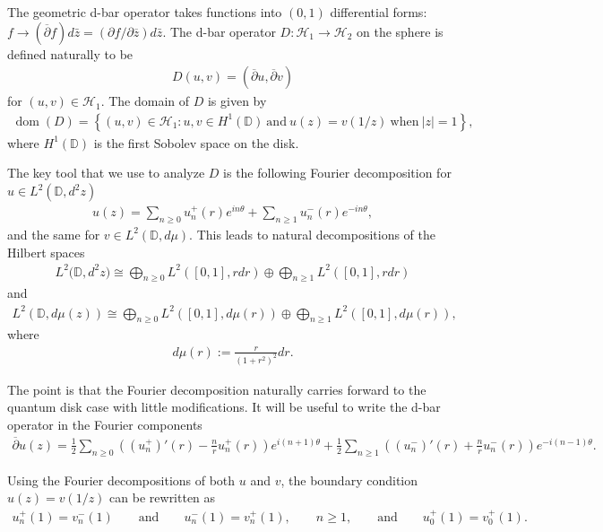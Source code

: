 \documentclass[11pt]{article}
\numberwithin{equation}{section}
\DeclareMathOperator{\dom}{dom}
\begin{document}
The geometric d-bar operator takes functions into $(0,1)$ dif\/ferential forms: $f\to (\overline{\partial}f)d\bar z=
(\partial f/\partial\overline{z})d\bar z$.
The d-bar operator $D: \mathcal{H}_1\to\mathcal{H}_2$ on the sphere is def\/ined naturally to be
\begin{gather}
\label{dirac_op}
D(u,v) = (\overline{\partial}u, \overline{\partial}v)
\end{gather}
for $(u,v)\in\mathcal{H}_1$.
The domain of $D$ is given by
\begin{gather}
\label{dom_D}
\dom(D) = \left\{(u,v)\in\mathcal{H}_1: u,v\in H^1({\mathbb D})~\text{and}~u(z)=v(1/z)~\textrm{when}~|z|=1\right\},
\end{gather}
where $H^1({\mathbb D})$ is the f\/irst Sobolev space on the disk.

The key tool that we use to analyze $D$ is the following Fourier decomposition for $u\in L^2({\mathbb D},d^2z)$
\begin{gather*}
u(z) = \sum\limits_{n\ge0} u_n^+(r) e^{in\theta} + \sum\limits_{n\ge1}u_n^-(r)e^{-in\theta},
\end{gather*}
and the same for $v\in L^2({\mathbb D},d\mu)$.
This leads to natural decompositions of the Hilbert spaces
\begin{gather*}
L^2\big({\mathbb D}, d^2z\big) \cong \bigoplus_{n\ge0} L^2\left([0,1],rdr\right)\oplus \bigoplus_{n\ge
1}L^2\left([0,1],rdr\right)
\end{gather*}
and
\begin{gather*}
L^2({\mathbb D},d\mu(z)) \cong \bigoplus_{n\ge0} L^2\left([0,1], d\mu(r)\right) \oplus \bigoplus_{n\ge1} L^2\left([0,1],d\mu(r)\right),
\end{gather*}
where
\begin{gather*}
d\mu(r):= \frac{r}{(1+r^2)^2}dr.
\end{gather*}

The point is that the Fourier decomposition naturally carries forward to the quantum disk case with little
modif\/ications.
It will be useful to write the d-bar operator in the Fourier components
\begin{gather}
\label{classDTO}
\overline{\partial}u(z) = \frac{1}{2}\sum\limits_{n\ge0}\!\left(\left(u_n^+\right)'(r) - \frac{n}{r}u_n^+(r)\right)e^{i(n+1)\theta}
+ \frac{1}{2}\sum\limits_{n\ge1}\!\left(\left(u_n^-\right)'(r) + \frac{n}{r}u_n^-(r)\right)e^{-i(n-1)\theta}.
\end{gather}

Using the Fourier decompositions of both $u$ and $v$, the boundary condition $u(z)=v(1/z)$ can be rewritten as
\begin{gather}
\label{bcft}
u_n^+(1) = v_n^-(1)
\qquad
\textrm{and}
\qquad
u_n^-(1) = v_n^+(1),
\qquad
n\ge 1,
\qquad
\textrm{and}
\qquad
u_0^+(1) = v_0^+(1).
\end{gather}
\end{document}
